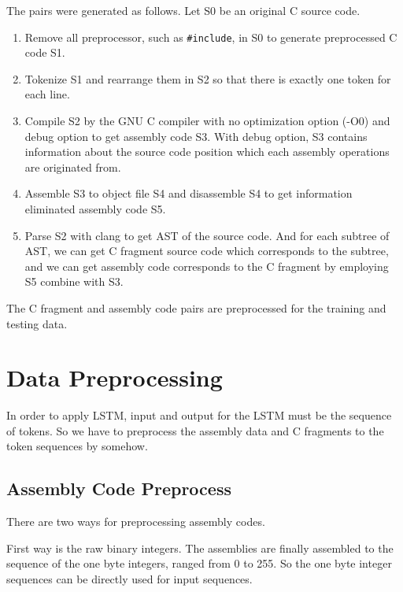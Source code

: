\documentclass[senior,final,11pt]{iscs-thesis}
\begin{document}
The pairs were generated as follows. Let S0 be an original C source code.
\begin{enumerate}
\item Remove all preprocessor, such as \texttt{\#include}, in S0 to generate preprocessed C code S1. 
\item Tokenize S1 and rearrange them in S2 so that there is exactly one token for each line. 
\item 
Compile S2 by the GNU C compiler with no optimization option (-O0) and debug option to get assembly code S3. 
With debug option, S3 contains information about the source code position which each assembly operations are originated from.
\item Assemble S3 to object file S4 and disassemble S4 to get information eliminated assembly code S5.
\item 
Parse S2 with clang to get AST of the source code. 
And for each subtree of AST, we can get C fragment source code which corresponds to the subtree, 
and we can get assembly code corresponds to the C fragment by employing S5 combine with S3.
\end{enumerate}

The C fragment and assembly code pairs are preprocessed for the training and testing data.


\section{Data Preprocessing}

In order to apply LSTM, input and output for the LSTM must be the sequence of tokens. 
So we have to preprocess the assembly data and C fragments to the token sequences by somehow.

\subsection{Assembly Code Preprocess}
There are two ways for preprocessing assembly codes.

First way is the raw binary integers. The assemblies are finally assembled to the sequence of the one byte integers, ranged from 0 to 255.
So the one byte integer sequences can be directly used for input sequences.
\end{document}
